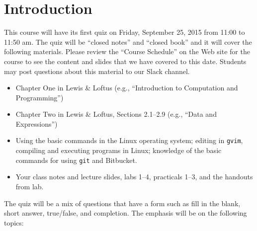 


\section*{Introduction}

This course will have its first quiz on Friday, September 25, 2015 from 11:00 to 11:50 am. The quiz will be ``closed
notes'' and ``closed book'' and it will cover the following materials. Please review the ``Course Schedule'' on the Web
site for the course to see the content and slides that we have covered to this date. Students may post questions about
this material to our Slack channel.

\begin{itemize}

  \itemsep 0in

  \item Chapter One in Lewis \& Loftus (e.g., ``Introduction to Computation and Programming'')

  \item Chapter Two in Lewis \& Loftus, Sections 2.1--2.9 (e.g., ``Data and Expressions'')

  \item Using the basic commands in the Linux operating system; editing in {\tt gvim}, compiling and executing
    programs in Linux; knowledge of the basic commands for using {\tt git} and Bitbucket.

  \item Your class notes and lecture slides, labs 1--4, practicals 1--3, and the handouts from lab.

\end{itemize}

\noindent The quiz will be a mix of questions that have a form such as fill in the blank, short answer, true/false, and
completion.  The emphasis will be on the following topics:

